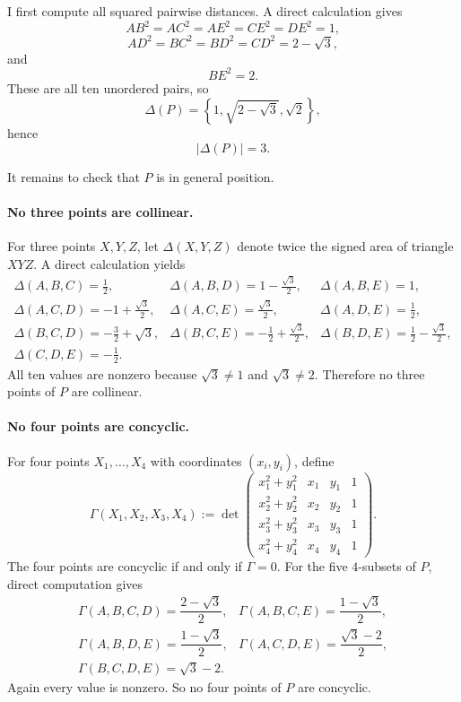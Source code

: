 I first compute all squared pairwise distances.
A direct calculation gives
\[
AB^2=AC^2=AE^2=CE^2=DE^2=1,
\]
\[
AD^2=BC^2=BD^2=CD^2=2-\sqrt3,
\]
and
\[
BE^2=2.
\]
These are all ten unordered pairs, so
\[
\Delta(P)=\left\{1,\sqrt{2-\sqrt3},\sqrt2\right\},
\]
hence
\[
|\Delta(P)|=3.
\]

It remains to check that $P$ is in general position.

\paragraph{No three points are collinear.}
For three points $X,Y,Z$, let $\Delta(X,Y,Z)$ denote twice the signed area of triangle $XYZ$.
A direct calculation yields
\[
\begin{array}{lll}
\Delta(A,B,C)=\frac12, &
\Delta(A,B,D)=1-\frac{\sqrt3}{2}, &
\Delta(A,B,E)=1, \\[6pt]
\Delta(A,C,D)=-1+\frac{\sqrt3}{2}, &
\Delta(A,C,E)=\frac{\sqrt3}{2}, &
\Delta(A,D,E)=\frac12, \\[6pt]
\Delta(B,C,D)=-\frac32+\sqrt3, &
\Delta(B,C,E)=-\frac12+\frac{\sqrt3}{2}, &
\Delta(B,D,E)=\frac12-\frac{\sqrt3}{2}, \\[6pt]
\Delta(C,D,E)=-\frac12.
\end{array}
\]
All ten values are nonzero because $\sqrt3\neq 1$ and $\sqrt3\neq 2$.
Therefore no three points of $P$ are collinear.

\paragraph{No four points are concyclic.}
For four points $X_1,\dots,X_4$ with coordinates $(x_i,y_i)$, define
\[
\Gamma(X_1,X_2,X_3,X_4):=
\det\!\begin{pmatrix}
x_1^2+y_1^2 & x_1 & y_1 & 1\\
x_2^2+y_2^2 & x_2 & y_2 & 1\\
x_3^2+y_3^2 & x_3 & y_3 & 1\\
x_4^2+y_4^2 & x_4 & y_4 & 1
\end{pmatrix}.
\]
The four points are concyclic if and only if $\Gamma=0$.
For the five $4$-subsets of $P$, direct computation gives
\[
\begin{array}{ll}
\Gamma(A,B,C,D)=\dfrac{2-\sqrt3}{2}, &
\Gamma(A,B,C,E)=\dfrac{1-\sqrt3}{2}, \\[10pt]
\Gamma(A,B,D,E)=\dfrac{1-\sqrt3}{2}, &
\Gamma(A,C,D,E)=\dfrac{\sqrt3-2}{2}, \\[10pt]
\Gamma(B,C,D,E)=\sqrt3-2.
\end{array}
\]
Again every value is nonzero.
So no four points of $P$ are concyclic.

